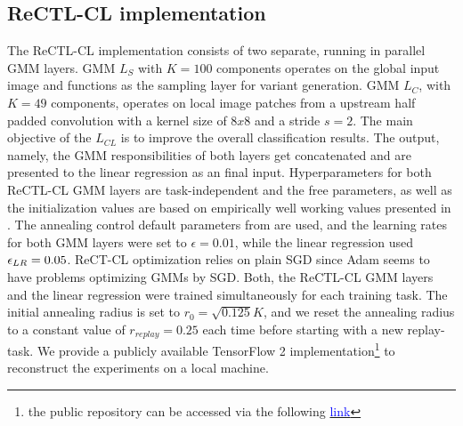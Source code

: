 \documentclass{article} %
\begin{document}
\subsection{ReCTL-CL implementation}
The ReCTL-CL implementation consists of two separate, running in parallel GMM layers. GMM $L_{S}$ with $K=100$ components operates on the global input image and functions as the sampling layer for variant generation. GMM $L_{C}$, with $K=49$ components, operates on local image patches from a upstream half padded convolution with a kernel size of $8x8$ and a stride $s=2$. The main objective of the $L_{CL}$ is to improve the overall classification results. The output, namely, the GMM responsibilities of both layers get concatenated and are presented to the linear regression as an final input.
Hyperparameters for both ReCTL-CL GMM layers are task-independent and the free parameters, as well as the initialization values are based on empirically well working values presented in \cite{sgdgmm}. The annealing control default parameters from \cite{sgdgmm} are used, and the learning rates for both GMM layers were set to $\epsilon=0.01$, while the linear regression used ${\epsilon}_{LR}=0.05$. ReCT-CL optimization relies on plain SGD since Adam seems to have problems optimizing GMMs by SGD. Both, the ReCTL-CL GMM layers and the linear regression were trained simultaneously for each training task. The initial annealing radius is set to $r_0=\sqrt{0.125} K$, and we reset the annealing radius to a constant value of $r_{replay}=0.25$ each time before starting with a new replay-task.
%
We provide a publicly available TensorFlow 2 implementation\footnote{the public repository can be accessed via the following \href{https://github.com/TODO/TODO}{\textcolor{blue}{link}}} to reconstruct the experiments on a local machine.
%
\end{document}
